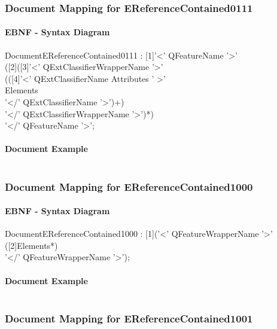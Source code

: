 \documentclass[11pt,a4paper]{article}
\begin{document}
\subsubsection{Document Mapping for EReferenceContained0111}
\paragraph{EBNF - Syntax Diagram}
\begin{rail}
DocumentEReferenceContained0111 : [1]'<' QFeatureName '>'  \\
([2]([3]'<' QExtClassifierWrapperName  '>'\\
(([4]'<' QExtClassifierName   Attributes ' >' \\
Elements \\
'</' QExtClassifierName   '>')+) \\
'</' QExtClassifierWrapperName   '>')*)\\
'</' QFeatureName '>'; 
\end{rail}
\paragraph{Document Example}
\inputminted[fontsize=\footnotesize]{xml}{examples/EReferenceContained0111.xml}

\subsubsection{Document Mapping for EReferenceContained1000}
\paragraph{EBNF - Syntax Diagram}
\begin{rail}
DocumentEReferenceContained1000 : [1]('<' QFeatureWrapperName '>' \\
([2]Elements*) \\
'</' QFeatureWrapperName '>');
\end{rail}
\paragraph{Document Example}
\inputminted[fontsize=\footnotesize]{xml}{examples/EReferenceContained1000.xml}

\subsubsection{Document Mapping for EReferenceContained1001}
\end{document}
